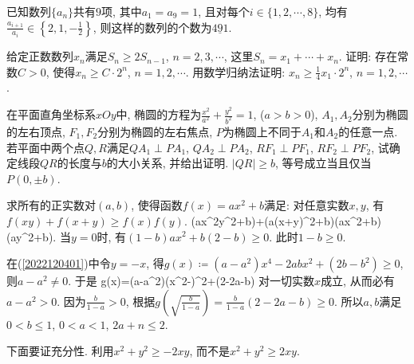 \begin{center}
\end{center}
\ea

\bq{}{}
已知数列$\{a_n\}$共有$9$项, 其中$a_1=a_9=1$, 且对每个$i\in\{1,2,\cdots,8\}$, 均有$\frac{a_{i+1}}{a_i}\in\left\{2,1,-\frac12\right\}$, 
则这样的数列的个数为$\underline{491}$.
\eq

\bq{}{}
给定正数数列${x_n}$满足$S_n\ge2S_{n-1}$, $n=2,3,\cdots$, 这里$S_n=x_1+\cdots+x_n$. 证明: 存在常数$C>0$, 使得$x_n\ge C\cdot 2^n$, $n=1,2,\cdots$.
\eq
\ba
用数学归纳法证明: $x_n\ge\frac14x_1\cdot 2^n$, $n=1,2,\cdots$.
\ea

\bq{}{}
在平面直角坐标系$xOy$中, 椭圆的方程为$\frac{x^2}{a^2}+\frac{y^2}{b^2}=1$, ($a>b>0$), $A_1,A_2$分别为椭圆的左右顶点, 
$F_1,F_2$分别为椭圆的左右焦点, $P$为椭圆上不同于$A_1$和$A_2$的任意一点. 若平面中两个点$Q,R$满足$QA_1\perp PA_1$, 
$QA_2\perp PA_2$, $RF_1\perp PF_1$, $RF_2\perp PF_2$, 试确定线段$QR$的长度与$b$的大小关系, 并给出证明.
\eq
\ba
$|QR|\ge b$, 等号成立当且仅当$P(0,\pm b)$.
\ea

\bq{}{}
求所有的正实数对$(a,b)$, 使得函数$f(x)=ax^2+b$满足: 对任意实数$x,y$, 有$f(xy)+f(x+y)\ge f(x)f(y)$.
\eq
\ba
\be\label{2022120401}
(ax^2y^2+b)+(a(x+y)^2+b)\ge(ax^2+b)(ay^2+b).
\ee
当$y=0$时, 有$(1-b)ax^2+b(2-b)\ge0$. 此时$1-b\ge 0$.

在(\ref{2022120401})中令$y=-x$, 得$g(x)\coloneqq (a-a^2)x^4-2abx^2+(2b-b^2)\ge 0$, 则$a-a^2\ne 0$. 
于是
\bee
g(x)=(a-a^2)\left(x^{2}-\right)^{2}+(2-2a-b)
\eee
对一切实数$x$成立, 从而必有$a-a^2>0$. 因为$\frac{b}{1-a}>0$, 根据$g\left(\sqrt{\frac{b}{1-a}}\right)=\frac{b}{1-a}(2-2a-b)\ge0$.
所以$a,b$满足$0<b\le 1$, $0<a<1$, $2a+n\le 2$.

下面要证充分性. 利用$x^2 +y^2\ge -2xy$, 而不是$x^2+y^2\ge 2xy$.
\ea

